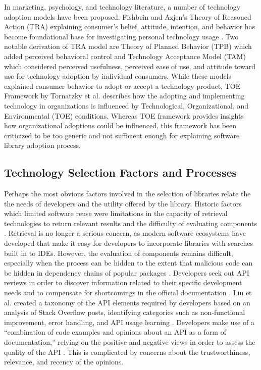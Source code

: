 In marketing, psychology, and technology literature, a number of technology adoption models have been proposed. Fishbein and Azjen's Theory of Reasoned Action (TRA) \cite{flanders1975belief-tra} explaining consumer's belief, attitude, intention, and behavior has become foundational base for investigating personal technology usage \cite{taherdoost2018-adoption-models}. Two notable derivation of TRA model are Theory of Planned Behavior (TPB) \cite{ajzen1991-tpb} which added perceived behavioral control and Technology Acceptance Model (TAM) \cite{davis1985tam, davis1989-tam-usefulness} which considered perceived usefulness, perceived ease of use, and attitude toward use for technology adoption by individual consumers. While these models explained consumer behavior to adopt or accept a technology product, TOE Framework by Tornatzky et al. \cite{tornatzky1990processes-toe} describes how the adopting and implementing technology in organizations is influenced by Technological, Organizational, and Environmental (TOE) conditions. Whereas TOE framework provides insights how organizational adoptions could be influenced, this framework has been criticized to be too generic \cite{zhu2005post-toe-critic} and not sufficient enough for explaining software library adoption process.



\subsection{Technology Selection Factors and Processes}\label{sec:lit:processes}

Perhaps the most obvious factors involved in the selection of libraries relate the the needs of developers and the utility offered by the library. Historic factors which limited software reuse were limitations in the capacity of retrieval technologies to return relevant results and the difficulty of evaluating components \cite{hummel2008code}. Retrieval is no longer a serious concern, as modern software ecosystems have developed that make it easy for developers to incorporate libraries with searches built in to IDEs. However, the evaluation of components remains difficult, especially when the process can be hidden to the extent that malicious code can be hidden in dependency chains of popular packages \cite{wyss2022wolf}. Developers seek out API reviews in order to discover information related to their specific development needs and to compensate for shortcomings in the official documentation \cite{uddin2019understanding}. Liu et al. created a taxonomy of the API elements required by developers based on an analysis of Stack Overflow posts, identifying categories such as non-functional improvement, error handling, and API usage learning \cite{liu2021api}. Developers make use of a ``combination of code examples and opinions about an API as a form of documentation,'' relying on the positive and negative views in order to assess the quality of the API \cite{uddin2019understanding}. This is complicated by concerns about the trustworthiness, relevance, and recency of the opinions. %

